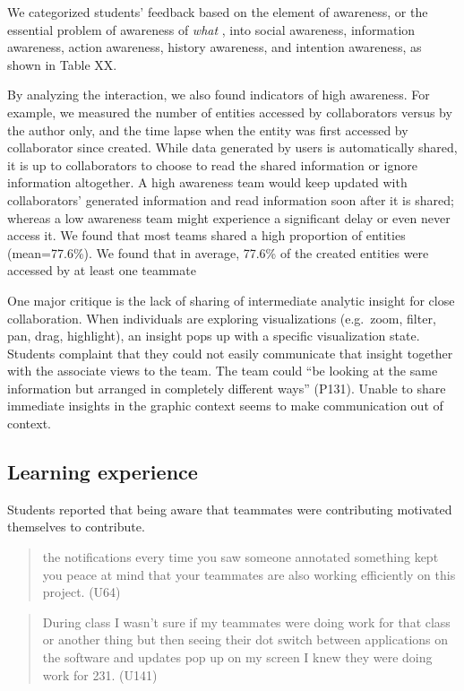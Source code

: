 \documentclass[]{article}
\begin{document}
We categorized students' feedback based on the element of awareness, or
the essential problem of awareness of \emph{what}
\autocite{Schmidt2002}, into social awareness, information awareness,
action awareness, history awareness, and intention awareness, as shown
in Table XX.

By analyzing the interaction, we also found indicators of high
awareness. For example, we measured the number of entities accessed by
collaborators versus by the author only, and the time lapse when the
entity was first accessed by collaborator since created. While data
generated by users is automatically shared, it is up to collaborators to
choose to read the shared information or ignore information altogether.
A high awareness team would keep updated with collaborators' generated
information and read information soon after it is shared; whereas a low
awareness team might experience a significant delay or even never access
it. We found that most teams shared a high proportion of entities
(mean=77.6\%). We found that in average, 77.6\% of the created entities
were accessed by at least one teammate

One major critique is the lack of sharing of intermediate analytic
insight for close collaboration. When individuals are exploring
visualizations (e.g.~zoom, filter, pan, drag, highlight), an insight
pops up with a specific visualization state. Students complaint that
they could not easily communicate that insight together with the
associate views to the team. The team could ``be looking at the same
information but arranged in completely different ways'' (P131). Unable
to share immediate insights in the graphic context seems to make
communication out of context.

\subsection{Learning experience}\label{learning-experience}

Students reported that being aware that teammates were contributing
motivated themselves to contribute.

\begin{quote}
the notifications every time you saw someone annotated something kept
you peace at mind that your teammates are also working efficiently on
this project. (U64)
\end{quote}

\begin{quote}
During class I wasn't sure if my teammates were doing work for that
class or another thing but then seeing their dot switch between
applications on the software and updates pop up on my screen I knew they
were doing work for 231. (U141)
\end{quote}
\end{document}
